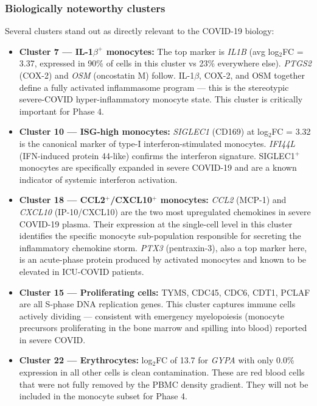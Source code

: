 \documentclass[11pt, a4paper]{article}
\begin{document}
\subsubsection*{Biologically noteworthy clusters}

Several clusters stand out as directly relevant to the COVID-19 biology:

\begin{itemize}[nosep]
  \item \textbf{Cluster 7 — IL-1$\beta^+$ monocytes:}
        The top marker is \textit{IL1B} (avg log$_2$FC = 3.37, expressed in
        90\% of cells in this cluster vs 23\% everywhere else).
        \textit{PTGS2} (COX-2) and \textit{OSM} (oncostatin M) follow.
        IL-1$\beta$, COX-2, and OSM together define a fully activated
        inflammasome program — this is the stereotypic severe-COVID
        hyper-inflammatory monocyte state. This cluster is critically
        important for Phase 4.

  \item \textbf{Cluster 10 — ISG-high monocytes:}
        \textit{SIGLEC1} (CD169) at log$_2$FC = 3.32 is the canonical marker
        of type-I interferon-stimulated monocytes. \textit{IFI44L} (IFN-induced
        protein 44-like) confirms the interferon signature.
        SIGLEC1$^+$ monocytes are specifically expanded in severe COVID-19
        and are a known indicator of systemic interferon activation.

  \item \textbf{Cluster 18 — CCL2$^+$/CXCL10$^+$ monocytes:}
        \textit{CCL2} (MCP-1) and \textit{CXCL10} (IP-10/CXCL10) are the
        two most upregulated chemokines in severe COVID-19 plasma.
        Their expression at the single-cell level in this cluster identifies
        the specific monocyte sub-population responsible for secreting
        the inflammatory chemokine storm. \textit{PTX3} (pentraxin-3),
        also a top marker here, is an acute-phase protein produced by
        activated monocytes and known to be elevated in ICU-COVID patients.

  \item \textbf{Cluster 15 — Proliferating cells:}
        TYMS, CDC45, CDC6, CDT1, PCLAF are all S-phase DNA replication
        genes. This cluster captures immune cells actively dividing —
        consistent with emergency myelopoiesis (monocyte precursors
        proliferating in the bone marrow and spilling into blood)
        reported in severe COVID.

  \item \textbf{Cluster 22 — Erythrocytes:}
        log$_2$FC of 13.7 for \textit{GYPA} with only 0.0\% expression in
        all other cells is clean contamination. These are red blood cells
        that were not fully removed by the PBMC density gradient.
        They will not be included in the monocyte subset for Phase 4.


\end{itemize}
\end{document}
